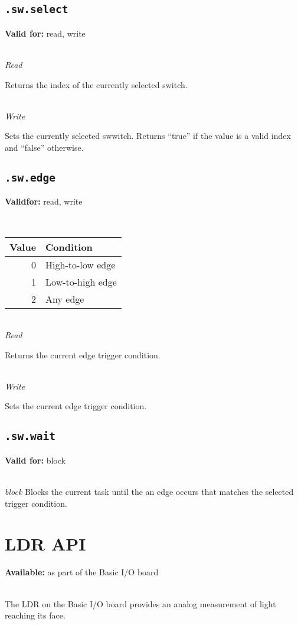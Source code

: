 \documentclass{article}
\begin{document}
\subsection{\texttt{.sw.select}}
\textbf{Valid for:} read, write

~\\
\textit{Read}

Returns the index of the currently selected switch.

~\\
\textit{Write}

Sets the currently selected swwitch. Returns ``true'' if the value is a valid index and ``false'' otherwise.

\subsection{\texttt{.sw.edge}}
\textbf{Validfor:} read, write

~\\
\begin{tabular}{rl}
Value & Condition \\ \hline
0 & High-to-low edge \\
1 & Low-to-high edge \\
2 & Any edge \\
\end{tabular}

~\\
\textit{Read}

Returns the current edge trigger condition.

~\\
\textit{Write}

Sets the current edge trigger condition.

\subsection{\texttt{.sw.wait}}
\textbf{Valid for:} block

~\\
\textit{block}
Blocks the current task until the an edge occurs that matches the selected trigger condition.

\section{LDR API}
\textbf{Available:} as part of the Basic I/O board

~\\
The LDR on the Basic I/O board provides an analog measurement of light reaching its face.
\end{document}
